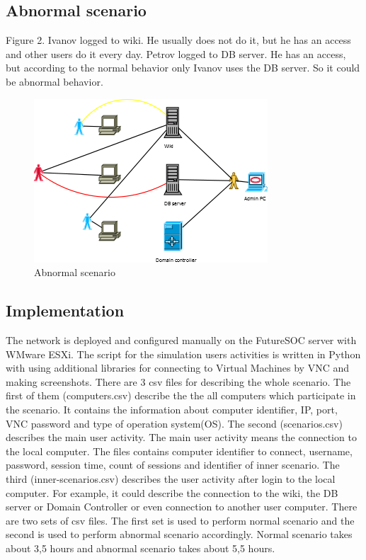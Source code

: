 \documentclass[twoside]{article}
\begin{document}
\subsection{Abnormal scenario}
Figure 2. Ivanov logged to wiki. He usually does not do it, but he has an access and other users do it every day. Petrov logged to DB server. He has an access, but according to the normal behavior only Ivanov uses the DB server. So it could be abnormal behavior.  

\begin{figure}[ht!]
\centering
\includegraphics{scenario_abnormal.png}
\caption{Abnormal scenario}
\label{overflow}
\end{figure}

\subsection{Implementation}
The network is deployed and configured manually on the FutureSOC server with WMware ESXi. The script for the simulation users activities is written in Python with using additional libraries for connecting to Virtual Machines by VNC and making screenshots. There are 3 csv files for describing the whole scenario. The first of them (computers.csv) describe the the all computers which participate in the scenario. It contains the information about computer identifier, IP, port, VNC password and type of operation system(OS).
The second (scenarios.csv) describes the main user activity. The main user activity means the connection to the local computer. The files contains computer identifier to connect, username, password, session time, count of sessions and identifier of inner scenario.
The third (inner-scenarios.csv) describes the user activity after login to the local computer. For example, it could describe the connection to the wiki, the DB server or Domain Controller or even connection to another user computer.  
There are two sets of csv files. The first set is used to perform normal scenario and the second is used to perform abnormal scenario 	
accordingly. Normal scenario takes about 3,5 hours and abnormal scenario takes about 5,5 hours.
 
\end{document}
